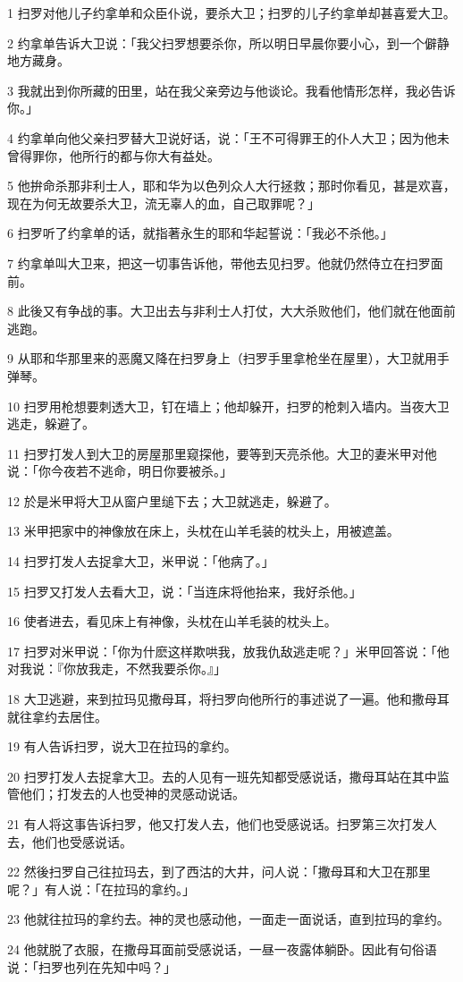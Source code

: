 \par 1 扫罗对他儿子约拿单和众臣仆说，要杀大卫；扫罗的儿子约拿单却甚喜爱大卫。
\par 2 约拿单告诉大卫说：「我父扫罗想要杀你，所以明日早晨你要小心，到一个僻静地方藏身。
\par 3 我就出到你所藏的田里，站在我父亲旁边与他谈论。我看他情形怎样，我必告诉你。」
\par 4 约拿单向他父亲扫罗替大卫说好话，说：「王不可得罪王的仆人大卫；因为他未曾得罪你，他所行的都与你大有益处。
\par 5 他拚命杀那非利士人，耶和华为以色列众人大行拯救；那时你看见，甚是欢喜，现在为何无故要杀大卫，流无辜人的血，自己取罪呢？」
\par 6 扫罗听了约拿单的话，就指著永生的耶和华起誓说：「我必不杀他。」
\par 7 约拿单叫大卫来，把这一切事告诉他，带他去见扫罗。他就仍然侍立在扫罗面前。
\par 8 此後又有争战的事。大卫出去与非利士人打仗，大大杀败他们，他们就在他面前逃跑。
\par 9 从耶和华那里来的恶魔又降在扫罗身上（扫罗手里拿枪坐在屋里），大卫就用手弹琴。
\par 10 扫罗用枪想要刺透大卫，钉在墙上；他却躲开，扫罗的枪刺入墙内。当夜大卫逃走，躲避了。
\par 11 扫罗打发人到大卫的房屋那里窥探他，要等到天亮杀他。大卫的妻米甲对他说：「你今夜若不逃命，明日你要被杀。」
\par 12 於是米甲将大卫从窗户里缒下去；大卫就逃走，躲避了。
\par 13 米甲把家中的神像放在床上，头枕在山羊毛装的枕头上，用被遮盖。
\par 14 扫罗打发人去捉拿大卫，米甲说：「他病了。」
\par 15 扫罗又打发人去看大卫，说：「当连床将他抬来，我好杀他。」
\par 16 使者进去，看见床上有神像，头枕在山羊毛装的枕头上。
\par 17 扫罗对米甲说：「你为什麽这样欺哄我，放我仇敌逃走呢？」米甲回答说：「他对我说：『你放我走，不然我要杀你。』」
\par 18 大卫逃避，来到拉玛见撒母耳，将扫罗向他所行的事述说了一遍。他和撒母耳就往拿约去居住。
\par 19 有人告诉扫罗，说大卫在拉玛的拿约。
\par 20 扫罗打发人去捉拿大卫。去的人见有一班先知都受感说话，撒母耳站在其中监管他们；打发去的人也受神的灵感动说话。
\par 21 有人将这事告诉扫罗，他又打发人去，他们也受感说话。扫罗第三次打发人去，他们也受感说话。
\par 22 然後扫罗自己往拉玛去，到了西沽的大井，问人说：「撒母耳和大卫在那里呢？」有人说：「在拉玛的拿约。」
\par 23 他就往拉玛的拿约去。神的灵也感动他，一面走一面说话，直到拉玛的拿约。
\par 24 他就脱了衣服，在撒母耳面前受感说话，一昼一夜露体躺卧。因此有句俗语说：「扫罗也列在先知中吗？」

